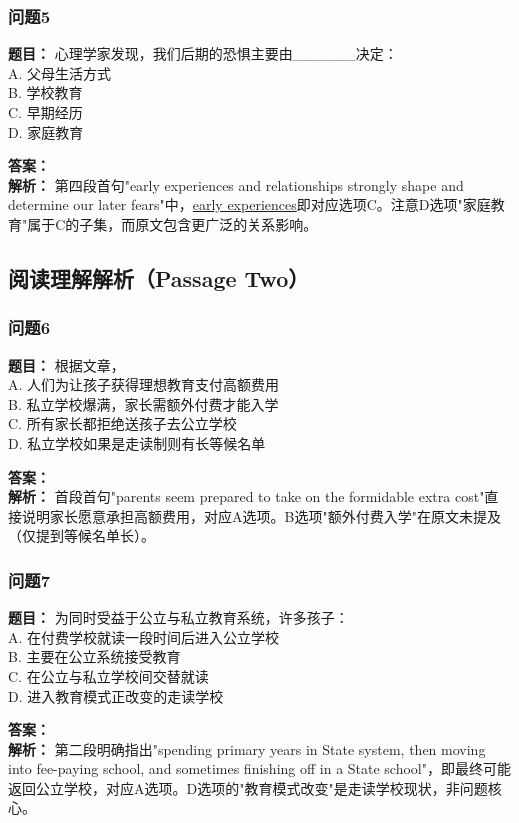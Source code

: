 \documentclass{article}
\begin{document}
\subsubsection*{问题5}
\textbf{题目：} 心理学家发现，我们后期的恐惧主要由\_\_\_\_\_\_决定：\\
A. 父母生活方式 \\
B. 学校教育 \\
C. 早期经历 \\
D. 家庭教育

\textbf{答案：}  \\
\textbf{解析：} 第四段首句"early experiences and relationships strongly shape and determine our later fears"中，\underline{early experiences}即对应选项C。注意D选项"家庭教育"属于C的子集，而原文包含更广泛的关系影响。


\subsection*{阅读理解解析（Passage Two）}

\subsubsection*{问题6}
\textbf{题目：} 根据文章，\\
A. 人们为让孩子获得理想教育支付高额费用 \\
B. 私立学校爆满，家长需额外付费才能入学 \\
C. 所有家长都拒绝送孩子去公立学校 \\
D. 私立学校如果是走读制则有长等候名单

\textbf{答案：}  \\
\textbf{解析：} 首段首句"parents seem prepared to take on the formidable extra cost"直接说明家长愿意承担高额费用，对应A选项。B选项"额外付费入学"在原文未提及（仅提到等候名单长）。

\subsubsection*{问题7}
\textbf{题目：} 为同时受益于公立与私立教育系统，许多孩子：\\
A. 在付费学校就读一段时间后进入公立学校 \\
B. 主要在公立系统接受教育 \\
C. 在公立与私立学校间交替就读 \\
D. 进入教育模式正改变的走读学校

\textbf{答案：}  \\
\textbf{解析：} 第二段明确指出"spending primary years in State system, then moving into fee-paying school, and sometimes finishing off in a State school"，即最终可能返回公立学校，对应A选项。D选项的"教育模式改变"是走读学校现状，非问题核心。
\end{document}
